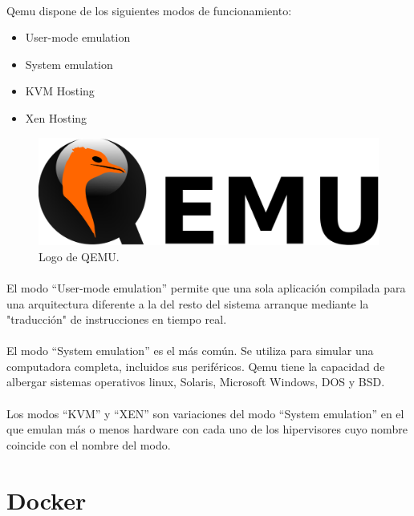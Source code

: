 \paragraph{}Qemu dispone de los siguientes modos de funcionamiento:

\begin{itemize}
	\item User-mode emulation
	\item System emulation
	\item \gls{KVM} Hosting
	\item Xen Hosting
\end{itemize}

\begin{figure}[h]
	\centering
	\includegraphics[width=0.50\linewidth]{imgs/qemu-logo}
	\caption[Qemu Logo]{Logo de QEMU.}
	\label{fig:qemu}
\end{figure}

\paragraph{} El modo ``User-mode emulation'' permite que una sola aplicación compilada
para una arquitectura diferente a la del resto del sistema arranque mediante la "traducción"
de instrucciones en tiempo real.

\paragraph{} El modo ``System emulation'' es el más común. Se utiliza para simular una
computadora completa, incluidos sus periféricos. Qemu tiene la capacidad de albergar
sistemas operativos linux, Solaris, Microsoft Windows, DOS y BSD.

\paragraph{} Los modos ``\gls{KVM}'' y ``\gls{XEN}'' son variaciones del modo ``System
emulation'' en el que emulan más o menos hardware con cada uno de los hipervisores cuyo
nombre coincide con el nombre del modo.

\section{Docker}\label{sec:docker}

